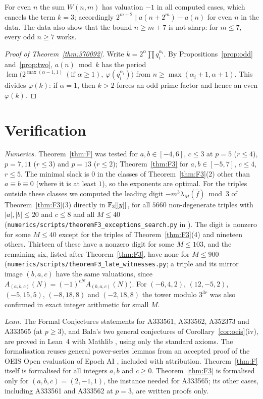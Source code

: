 \documentclass[11pt]{amsart}
\begin{document}
\begin{remark}
For even $n$ the sum $W(n,m)$ has valuation $-1$ in all computed cases, which cancels the term $k=3$; accordingly $2^{m+2}\mid a(n+2^m)-a(n)$ for even $n$ in the data. The data also show that the bound $n\ge m+7$ is not sharp: for $m\le7$, every odd $n\ge7$ works.
\end{remark}

\begin{proof}[Proof of Theorem~\ref{thm:370092}]
Write $k=2^\alpha\prod q_i^{\alpha_i}$. By Propositions~\ref{prop:odd} and~\ref{prop:two}, $a(n)\bmod k$ has the period $\operatorname{lcm}\bigl(2^{\max(\alpha-1,1)}\ (\text{if }\alpha\ge1),\ \varphi(q_i^{\alpha_i})\bigr)$ from $n\ge\max(\alpha_i+1,\alpha+1)$. This divides $\varphi(k)$: if $\alpha=1$, then $k>2$ forces an odd prime factor and hence an even $\varphi(k)$.
\end{proof}

\section{Verification}\label{sec:verifA}
\emph{Numerics.} Theorem~\ref{thm:F} was tested for $a,b\in[-4,6]$, $c\le3$ at $p=5$ ($r\le4$), $p=7,11$ ($r\le3$) and $p=13$ ($r\le2$); Theorem~\ref{thm:F3} for $a,b\in[-5,7]$, $c\le4$, $r\le5$. The minimal slack is $0$ in the classes of Theorem~\ref{thm:F3}(2) other than $a\equiv b\equiv0$ (where it is at least $1$), so the exponents are optimal. For the triples outside these classes we computed the leading digit $-m^3\lambda_M(\bar f)\bmod 3$ of Theorem~\ref{thm:F3}(3) directly in $\mathbb{F}_3[[y]]$, for all $5660$ non-degenerate triples with $|a|,|b|\le20$ and $c\le8$ and all $M\le40$ (\texttt{numerics/scripts/theoremF3\_exceptions\_search.py} in \cite{repo}). The digit is nonzero for some $M\le40$ except for the triples of Theorem~\ref{thm:F3}(4) and nineteen others. Thirteen of these have a nonzero digit for some $M\le103$, and the remaining six, listed after Theorem~\ref{thm:F3}, have none for $M\le900$ (\texttt{numerics/scripts/theoremF3\_late\_witnesses.py}; a triple and its mirror image $(b,a,c)$ have the same valuations, since $A_{(a,b,c)}(N)=(-1)^{cN}A_{(b,a,c)}(N)$). For $(-6,4,2)$, $(12,-5,2)$, $(-5,15,5)$, $(-8,18,8)$ and $(-2,18,8)$ the tower modulo $3^{3r}$ was also confirmed in exact integer arithmetic for small $M$.

\emph{Lean.} The Formal Conjectures statements for A333561, A333562, A352373 and A333565 (at $p\ge3$), and Bala's two general conjectures of Corollary~\ref{cor:oeis}(iv), are proved in Lean~4 \cite{lean4} with Mathlib \cite{mathlib2020} \cite{repo}, using only the standard axioms. The formalisation reuses general power-series lemmas from an accepted proof of the OEIS Open evaluation of Epoch AI \cite{adamczewski2026,epoch}, included with attribution. Theorem~\ref{thm:F} itself is formalised for all integers $a,b$ and $c\ge0$. Theorem~\ref{thm:F3} is formalised only for $(a,b,c)=(2,-1,1)$, the instance needed for A333565; its other cases, including A333561 and A333562 at $p=3$, are written proofs only.
\end{document}
